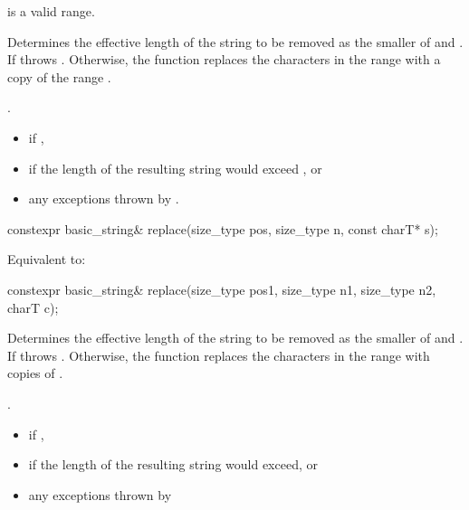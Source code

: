 \begin{itemdescr}
\pnum
\expects
{} is a valid range.

\pnum
\effects
Determines the effective length  of the string to be
removed as the smaller of  and . If
 throws . Otherwise,
the function replaces the characters in the range
with a copy of the range .

\pnum
\returns
{}.

\pnum
\throws
\begin{itemize}
\item {} if ,
\item {} if the length of the resulting string
would exceed , or
\item any exceptions thrown by .
\end{itemize}
\end{itemdescr}

%
\begin{itemdecl}
constexpr basic_string& replace(size_type pos, size_type n, const charT* s);
\end{itemdecl}

\begin{itemdescr}
\pnum
\effects
Equivalent to: 
\end{itemdescr}

%
\begin{itemdecl}
constexpr basic_string& replace(size_type pos1, size_type n1, size_type n2, charT c);
\end{itemdecl}

\begin{itemdescr}
\pnum
\effects
Determines the effective length  of the string to be
removed as the smaller of  and . If
  throws . Otherwise,
the function replaces the characters in the range
with  copies of .

\pnum
\returns
{}.

\pnum
\throws
\begin{itemize}
\item {} if ,
\item {} if the length of the resulting string
would exceed, or
\item any exceptions thrown by 
\end{itemize}
\end{itemdescr}

